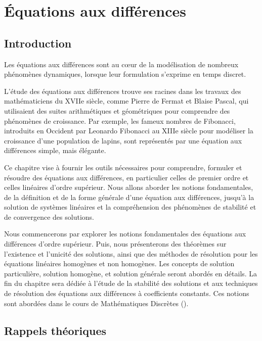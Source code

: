 \chapter{Équations aux différences}
    \section{Introduction}
        Les équations aux différences sont au cœur de la modélisation de nombreux phénomènes dynamiques, lorsque leur formulation s'exprime en temps discret.

        L’étude des équations aux différences trouve ses racines dans les travaux des mathématiciens du XVIIe siècle, comme Pierre de Fermat et Blaise Pascal, qui utilisaient des suites arithmétiques et géométriques pour comprendre des phénomènes de croissance. Par exemple, les fameux nombres de Fibonacci, introduits en Occident par Leonardo Fibonacci au XIIIe siècle pour modéliser la croissance d’une population de lapins, sont représentés par une équation aux différences simple, mais élégante.

        Ce chapitre vise à fournir les outils nécessaires pour comprendre, formuler et résoudre des équations aux différences, en particulier celles de premier ordre et celles linéaires d'ordre supérieur. Nous allons aborder les notions fondamentales, de la définition et de la forme générale d'une équation aux différences, jusqu’à la solution de systèmes linéaires et la compréhension des phénomènes de stabilité et de convergence des solutions.
        
        Nous commencerons par explorer les notions fondamentales des équations aux différences d’ordre supérieur. Puis, nous présenterons des théorèmes sur l'existence et l'unicité des solutions, ainsi que des méthodes de résolution pour les équations linéaires homogènes et non homogènes. Les concepts de solution particulière, solution homogène, et solution générale seront abordés en détails. La fin du chapitre sera dédiée à l’étude de la stabilité des solutions et aux techniques de résolution des équations aux différences à coefficients constants. Ces notions sont abordées dans le cours de Mathématiques Discrètes (\cite{mathf305}).
        
    \section{Rappels théoriques}
